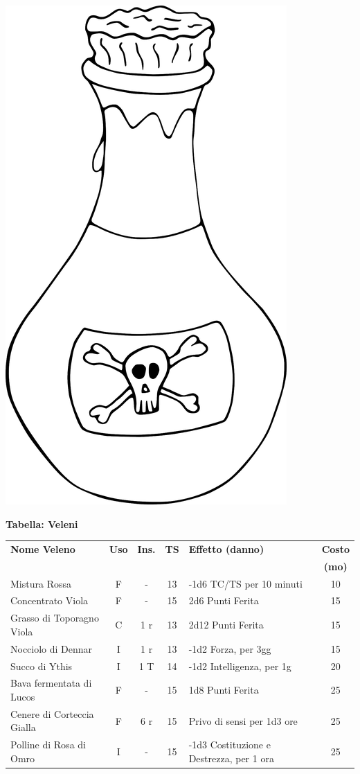 \vfill

\begin{center}
	\includegraphics[height=0.25\linewidth]{immagini/poison.png}
\end{center}

\textbf{Tabella: Veleni}\label{tabellaveleni}

\medskip

	\noindent\begin{tabularx}{\linewidth}{lcccXc}
	\toprule
 \rowcolor{gray!20}\textbf{Nome Veleno} & \textbf{Uso} & \textbf{Ins.} & \textbf{TS} & \textbf{Effetto (danno)} & \textbf{Costo}\\
 \rowcolor{gray!20}&&&&&\textbf{(mo)}\\
\toprule
	Mistura Rossa \index{Mistura Rossa} & F& -& 13& -1d6 TC/TS per 10 minuti & 10\\

 \rowcolor{gray!20}Concentrato Viola \index{Concentrato Viola} & F& -& 15& 2d6 Punti Ferita & 15\\

	Grasso di Toporagno Viola \index{Grasso di Toporagno Viola} & C& 1 r& 13& 2d12 Punti Ferita & 15\\

 \rowcolor{gray!20}Nocciolo di Dennar \index{Nocciolo di Dennar}& I& 1 r& 13& -1d2 Forza, per 3gg& 15\\

	Succo di Ythis\index{Succo di Ythis} & I& 1 T& 14& -1d2 Intelligenza, per 1g& 20\\

	Bava fermentata di Lucos \index{Bava fermentata di Lucos}\label{bavadilucos}\hypertarget{bavadilucos}{}& F& - & 15& 1d8 Punti Ferita& 25\\

 \rowcolor{gray!20}Cenere di Corteccia Gialla \index{Cenere di Corteccia Gialla} & F& 6 r& 15& Privo di sensi per 1d3 ore& 25\\

	Polline di Rosa di Omro\index{Polline di Rosa di Omro} & I& - & 15& -1d3 Costituzione e Destrezza, per 1 ora & 25\\


\end{tabularx}
